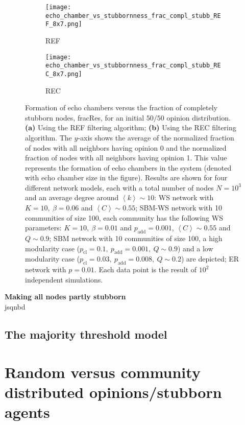 \documentclass[11 pt , letterpaper , twoside , openright]{book}
\begin{document}
\begin{figure}[H]
  \begin{subfigure}[b]{0.49\textwidth}
  	\texttt{[image: echo\_chamber\_vs\_stubbornness\_frac\_compl\_stubb\_REF\_8x7.png]}
    \caption{REF}
  \end{subfigure}
  \begin{subfigure}[b]{0.49\textwidth}
  	\texttt{[image: echo\_chamber\_vs\_stubbornness\_frac\_compl\_stubb\_REC\_8x7.png]}
    \caption{REC}
    \label{ws}
  \end{subfigure}
  \captionsetup{format=plain}
  \caption[Formation of echo chambers versus fraction of completely stubborn nodes, REF and REC]{Formation of echo chambers versus the fraction of completely stubborn nodes, fracRes, for an initial $50/50$ opinion distribution. \textbf{(a)} Using the REF filtering algorithm; \textbf{(b)} Using the REC filtering algorithm. The $y$-axis shows the average of the normalized fraction of nodes with all neighbors having opinion 0 and the normalized fraction of nodes with all neighbors having opinion 1. This value represents the formation of echo chambers in the system (denoted with echo chamber size in the figure). Results are shown for four different network models, each with a total number of nodes $N=10^3$ and an average degree around $\left<k\right> \sim 10$: WS network with $K =10,\ \beta = 0.06$ and $\left<C\right> \sim 0.55$; SBM-WS network with 10 communities of size 100, each community has the following WS parameters: $K = 10,\ \beta = 0.01$ and $p_{\text{add}} = 0.001$, $\left<C\right> \sim 0.55$ and $Q \sim 0.9$; SBM network with 10 communities of size 100, a high modularity case ($p_{\text{cl}} = 0.1,\ p_{\text{add}} = 0.001,\ Q \sim 0.9$) and a low modularity case ($p_{\text{cl}} = 0.03,\ p_{\text{add}} = 0.008,\ Q \sim 0.2$) are depicted; ER network with $p= 0.01$. Each data point is the result of $10^2$ independent simulations.}
\label{echo_vs_frac_complStubb_REF-REC}
\end{figure}
\noindent
\textbf{Making all nodes partly stubborn}\\
\newline
jsqnbd\\


\subsection{The majority threshold model}
\label{majThres}

\section{Random versus community distributed opinions/stubborn agents}
\end{document}
